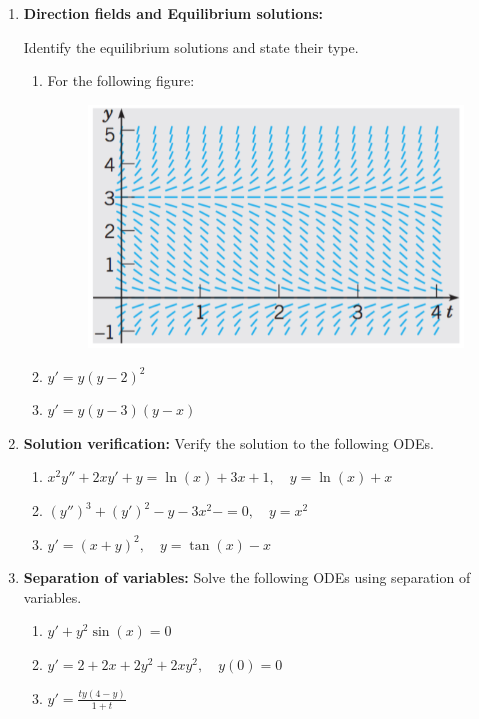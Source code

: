 \documentclass[letterpaper, fontsize=11pt]{scrartcl} %
\numberwithin{equation}{section} %
\numberwithin{figure}{section} %
\numberwithin{table}{section} %
\begin{document}
\begin{enumerate}

\item \textbf{Direction fields and Equilibrium solutions:} \par Identify the equilibrium solutions and state their type.
\begin{enumerate}

\item For the following figure:
\begin{figure}[h]
\centering \includegraphics[width = 0.4\columnwidth]{finalReview1.png}
\end{figure}

\item  $y' = y(y-2)^2$

\item $y' = y(y - 3)(y-x)$

\end{enumerate}

\item \textbf{Solution verification:} Verify the solution to the following ODEs. 
\begin{enumerate}

\item $x^2y''  + 2xy'  + y = \ln(x) + 3x + 1,\quad y = \ln(x) + x$

\item $(y'')^3 + (y')^2 - y - 3x^2 -  = 0, \quad y = x^2$

\item $y' = (x+y)^2,\quad y = \tan(x) - x$
\end{enumerate}

\item \textbf{Separation of variables:} Solve the following ODEs using separation of variables. 
\begin{enumerate}

\item $y' + y^2 \sin(x) = 0$ 

\item $y' =2+2x+2y^2 + 2xy^2, \quad y(0) = 0$

\item $y' =\frac{ty(4-y)}{1+t}$


\end{enumerate}
\end{enumerate}
\end{document}
